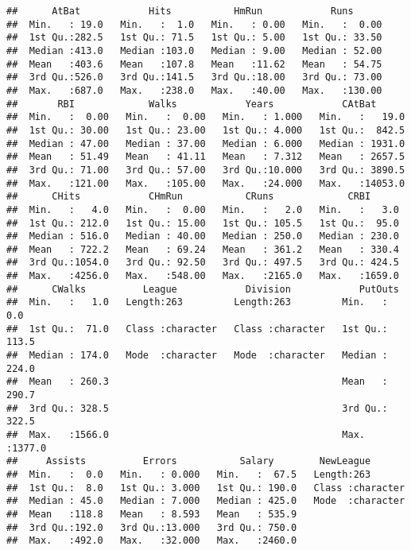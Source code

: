 \documentclass[
]{article}
\begin{document}
\begin{verbatim}
##      AtBat            Hits           HmRun            Runs       
##  Min.   : 19.0   Min.   :  1.0   Min.   : 0.00   Min.   :  0.00  
##  1st Qu.:282.5   1st Qu.: 71.5   1st Qu.: 5.00   1st Qu.: 33.50  
##  Median :413.0   Median :103.0   Median : 9.00   Median : 52.00  
##  Mean   :403.6   Mean   :107.8   Mean   :11.62   Mean   : 54.75  
##  3rd Qu.:526.0   3rd Qu.:141.5   3rd Qu.:18.00   3rd Qu.: 73.00  
##  Max.   :687.0   Max.   :238.0   Max.   :40.00   Max.   :130.00  
##       RBI             Walks            Years            CAtBat       
##  Min.   :  0.00   Min.   :  0.00   Min.   : 1.000   Min.   :   19.0  
##  1st Qu.: 30.00   1st Qu.: 23.00   1st Qu.: 4.000   1st Qu.:  842.5  
##  Median : 47.00   Median : 37.00   Median : 6.000   Median : 1931.0  
##  Mean   : 51.49   Mean   : 41.11   Mean   : 7.312   Mean   : 2657.5  
##  3rd Qu.: 71.00   3rd Qu.: 57.00   3rd Qu.:10.000   3rd Qu.: 3890.5  
##  Max.   :121.00   Max.   :105.00   Max.   :24.000   Max.   :14053.0  
##      CHits            CHmRun           CRuns             CRBI       
##  Min.   :   4.0   Min.   :  0.00   Min.   :   2.0   Min.   :   3.0  
##  1st Qu.: 212.0   1st Qu.: 15.00   1st Qu.: 105.5   1st Qu.:  95.0  
##  Median : 516.0   Median : 40.00   Median : 250.0   Median : 230.0  
##  Mean   : 722.2   Mean   : 69.24   Mean   : 361.2   Mean   : 330.4  
##  3rd Qu.:1054.0   3rd Qu.: 92.50   3rd Qu.: 497.5   3rd Qu.: 424.5  
##  Max.   :4256.0   Max.   :548.00   Max.   :2165.0   Max.   :1659.0  
##      CWalks          League            Division            PutOuts      
##  Min.   :   1.0   Length:263         Length:263         Min.   :   0.0  
##  1st Qu.:  71.0   Class :character   Class :character   1st Qu.: 113.5  
##  Median : 174.0   Mode  :character   Mode  :character   Median : 224.0  
##  Mean   : 260.3                                         Mean   : 290.7  
##  3rd Qu.: 328.5                                         3rd Qu.: 322.5  
##  Max.   :1566.0                                         Max.   :1377.0  
##     Assists          Errors           Salary        NewLeague        
##  Min.   :  0.0   Min.   : 0.000   Min.   :  67.5   Length:263        
##  1st Qu.:  8.0   1st Qu.: 3.000   1st Qu.: 190.0   Class :character  
##  Median : 45.0   Median : 7.000   Median : 425.0   Mode  :character  
##  Mean   :118.8   Mean   : 8.593   Mean   : 535.9                     
##  3rd Qu.:192.0   3rd Qu.:13.000   3rd Qu.: 750.0                     
##  Max.   :492.0   Max.   :32.000   Max.   :2460.0
\end{verbatim}
\end{document}
